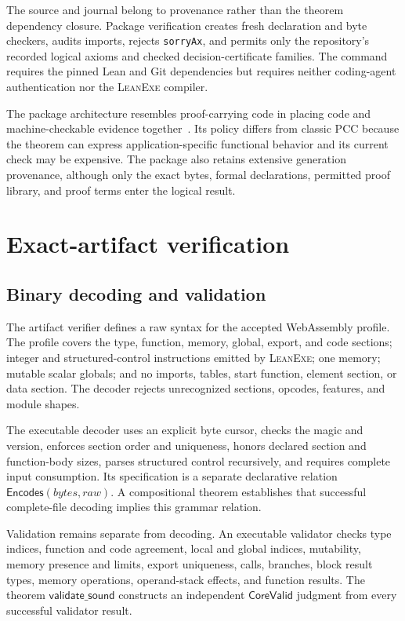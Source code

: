 \documentclass[11pt]{article}
\newcommand{\leanexe}{\textsc{LeanExe}}
\newcommand{\code}[1]{\texttt{#1}}
\begin{document}
The source and journal belong to provenance rather than the theorem dependency closure.  Package verification creates fresh declaration and byte checkers, audits imports, rejects \code{sorryAx}, and permits only the repository's recorded logical axioms and checked decision-certificate families.  The command requires the pinned Lean and Git dependencies but requires neither coding-agent authentication nor the \leanexe{} compiler.

The package architecture resembles proof-carrying code in placing code and machine-checkable evidence together~\cite{Necula1997PCC,Appel2001FoundationalPCC}.  Its policy differs from classic PCC because the theorem can express application-specific functional behavior and its current check may be expensive.  The package also retains extensive generation provenance, although only the exact bytes, formal declarations, permitted proof library, and proof terms enter the logical result.

\section{Exact-artifact verification}

\subsection{Binary decoding and validation}

The artifact verifier defines a raw syntax for the accepted WebAssembly profile.  The profile covers the type, function, memory, global, export, and code sections; integer and structured-control instructions emitted by \leanexe{}; one memory; mutable scalar globals; and no imports, tables, start function, element section, or data section.  The decoder rejects unrecognized sections, opcodes, features, and module shapes.

The executable decoder uses an explicit byte cursor, checks the magic and version, enforces section order and uniqueness, honors declared section and function-body sizes, parses structured control recursively, and requires complete input consumption.  Its specification is a separate declarative relation $\mathsf{Encodes}(bytes,raw)$.  A compositional theorem establishes that successful complete-file decoding implies this grammar relation.

Validation remains separate from decoding.  An executable validator checks type indices, function and code agreement, local and global indices, mutability, memory presence and limits, export uniqueness, calls, branches, block result types, memory operations, operand-stack effects, and function results.  The theorem $\mathsf{validate\_sound}$ constructs an independent $\mathsf{CoreValid}$ judgment from every successful validator result.
\end{document}
